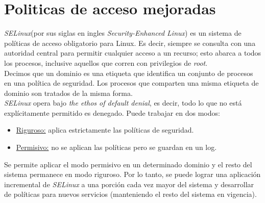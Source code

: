 \section{Politicas de acceso mejoradas}
\emph{SELinux}(por sus siglas en ingles \textit{Security-Enhanced Linux}) es un sistema de políticas de acceso obligatorio para Linux. Es decir, siempre se consulta con una autoridad central para permitir cualquier acceso a un recurso; esto abarca a todos los procesos, inclusive aquellos que corren con privilegios de \textit{root}.\\
Decimos que un dominio es una etiqueta que identifica un conjunto de procesos en una política de seguridad. Los procesos que comparten una misma etiqueta de dominio son tratados de la misma forma. \\
\emph{SELinux} opera bajo \textit{the ethos of default denial}, es decir, todo lo que no está explícitamente permitido es denegado. Puede trabajar en dos modos:
\begin{itemize}
    \item \underline{Riguroso:} aplica estrictamente las políticas de seguridad.
    \item \underline{Permisivo:} no se aplican las políticas pero se guardan en un log.
\end{itemize} 
Se permite aplicar el modo permisivo en un determinado dominio y el resto del sistema permanece en modo riguroso. Por lo tanto, se puede lograr una aplicación incremental de \emph{SELinux} a una porción cada vez mayor del sistema y desarrollar de políticas para nuevos servicios (manteniendo el resto del sistema en vigencia).
